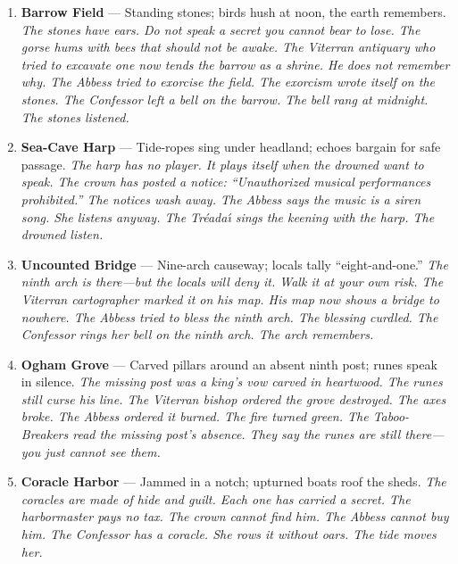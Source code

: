\begin{enumerate}
  \hfill \textit{The ladders are hauled up at dusk. If you're left below, you sleep with the tide. The crown calls it a ``fortified dwelling without license.'' The fort has no license. It has never needed one. The Everflame wants to build a chapel there. The chapel slides into the sea. The Gray Liturgy built a bell-shrine on the cliff. The bell rings at dusk. The fort still stands.}
\item \textbf{Barrow Field} --- Standing stones; birds hush at noon, the earth remembers.
  \hfill \textit{The stones have ears. Do not speak a secret you cannot bear to lose. The gorse hums with bees that should not be awake. The Viterran antiquary who tried to excavate one now tends the barrow as a shrine. He does not remember why. The Abbess tried to exorcise the field. The exorcism wrote itself on the stones. The Confessor left a bell on the barrow. The bell rang at midnight. The stones listened.}
\item \textbf{Sea-Cave Harp} --- Tide-ropes sing under headland; echoes bargain for safe passage.
  \hfill \textit{The harp has no player. It plays itself when the drowned want to speak. The crown has posted a notice: ``Unauthorized musical performances prohibited.'' The notices wash away. The Abbess says the music is a siren song. She listens anyway. The Tr\'eada\'{\i} sings the keening with the harp. The drowned listen.}
\item \textbf{Uncounted Bridge} --- Nine-arch causeway; locals tally ``eight-and-one.''
  \hfill \textit{The ninth arch is there---but the locals will deny it. Walk it at your own risk. The Viterran cartographer marked it on his map. His map now shows a bridge to nowhere. The Abbess tried to bless the ninth arch. The blessing curdled. The Confessor rings her bell on the ninth arch. The arch remembers.}
\item \textbf{Ogham Grove} --- Carved pillars around an absent ninth post; runes speak in silence.
  \hfill \textit{The missing post was a king's vow carved in heartwood. The runes still curse his line. The Viterran bishop ordered the grove destroyed. The axes broke. The Abbess ordered it burned. The fire turned green. The Taboo-Breakers read the missing post's absence. They say the runes are still there---you just cannot see them.}
\item[J] \textbf{Coracle Harbor} --- Jammed in a notch; upturned boats roof the sheds.
  \hfill \textit{The coracles are made of hide and guilt. Each one has carried a secret. The harbormaster pays no tax. The crown cannot find him. The Abbess cannot buy him. The Confessor has a coracle. She rows it without oars. The tide moves her.}

\end{enumerate}
